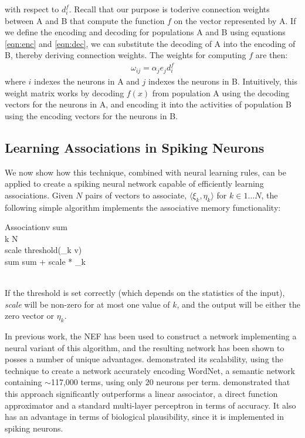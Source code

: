 \documentclass[10pt,letterpaper]{article}
\begin{document}
with respect to $d^f_i$.
Recall that our purpose is toderive connection weights between A and B that compute the function $f$ on the vector represented by A. If we define the encoding
and decoding for populations A and B using equations \eqref{eqn:enc} and \eqref{eqn:dec}, we can substitute the
decoding of A into the encoding of B, thereby deriving connection weights. The weights for computing $f$ are then:
\begin{align}
\omega_{ij} = \alpha_j e_j d^f_i \label{eqn:weight}
\end{align}
where $i$ indexes the neurons in A and $j$ indexes the neurons in B. Intuitively, this weight matrix works by decoding $f(x)$ from population A using the decoding vectors for the neurons in A, and encoding it into the activities of population B using the encoding vectors for the neurons in B.

\subsection{Learning Associations in Spiking Neurons}
We now show how this technique, combined with neural learning rules, can be applied to create a spiking neural network capable of efficiently learning associations. Given $N$ pairs of vectors to associate, $\langle\xi_k, \eta_k\rangle$ for $k \in 1 \dots N$, the following simple algorithm implements the associative memory functionality:
 
\renewcommand{\thepseudocode}{1}

\begin{pseudocode}[ruled]{Association}{v}
  \label{alg:simple}
  sum \\
  \FOR k  \TO N\\
  \BEGIN
    scale \GETS threshold(\xi_k \cdot v) \\
    sum \GETS sum + scale * \eta_k\\
  \END\\
\end{pseudocode} 

If the threshold is set correctly (which depends on the statistics of the input), \textit{scale} will be non-zero for at most one value of $k$, and the output will be either the zero vector or $\eta_k$.

In previous work, the NEF has been used to construct a network implementing a neural variant of this algorithm, and the resulting network has been shown to posses a number of unique advantages. \citet{crawford2013} demonstrated its scalability, using the technique to create a network accurately encoding WordNet, a semantic network containing $\sim$117,000 terms, using only 20 neurons per term. \citet{Stewart2010} demonstrated that this approach significantly outperforms a linear associator, a direct function approximator and a standard multi-layer perceptron in terms of accuracy. It also has an advantage in terms of biological plausibility, since it is implemented in spiking neurons.
\end{document}
